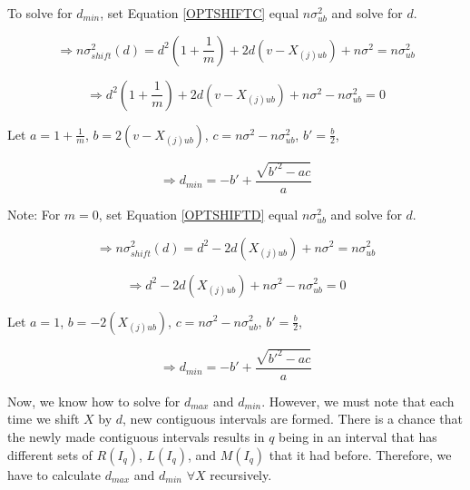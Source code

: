 \documentclass[a4paper,12pt]{article}
\begin{document}
To solve for $d_{min}$, set Equation \ref{OPTSHIFTC} equal $n \sigma_{ub}^2$ and solve for $d$. 

$$
\Rightarrow n\sigma^2_{shift}(d)= d^2(1+\frac{1}{m}) + 2d(v-X_{(j)ub}) + n\sigma^2 = n \sigma_{ub}^2
$$

$$
\Rightarrow d^2(1+\frac{1}{m}) + 2d(v-X_{(j)ub}) + n\sigma^2 - n \sigma_{ub}^2 = 0
$$

Let $a = 1+\frac{1}{m}$, $b=2(v-X_{(j)ub})$, $c=n\sigma^2 - n \sigma_{ub}^2$, $b'=\frac{b}{2}$, 

$$ \Rightarrow d_{min}= -b' + \frac{\sqrt{b'^2-ac}}{a}$$

Note: For $m = 0$, set Equation \ref{OPTSHIFTD} equal $n \sigma_{ub}^2$ and solve for $d$. 

$$
\Rightarrow n\sigma^2_{shift}(d)= d^2 - 2d(X_{(j)ub}) + n\sigma^2 = n \sigma_{ub}^2
$$

$$
\Rightarrow d^2 - 2d(X_{(j)ub}) + n\sigma^2 - n \sigma_{ub}^2 = 0
$$

Let $a = 1$, $b=-2(X_{(j)ub})$, $c=n\sigma^2 - n \sigma_{ub}^2$, $b'=\frac{b}{2}$, 

$$ \Rightarrow d_{min}= -b' + \frac{\sqrt{b'^2-ac}}{a}$$

Now, we know how to solve for $d_{max}$ and  $d_{min}$. However, we must note that each time we shift $X$ by $d$, new contiguous intervals are formed. There is a chance that the newly made contiguous intervals results in $q$ being in an interval that has different sets of $R(I_{q})$, $L(I_{q})$, and  $M(I_{q})$
that it had before. Therefore, we have to calculate $d_{max}$ and  $d_{min}$ $\forall X$ recursively. 
\end{document}
